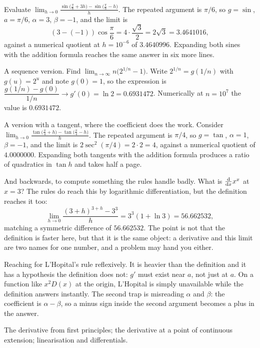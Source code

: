 \begin{worked}
Evaluate $\displaystyle\lim_{h\to0}\frac{\sin\bigl(\tfrac{\pi}{6}+3h\bigr)-\sin\bigl(\tfrac{\pi}{6}-h\bigr)}{h}$. The repeated argument is $\pi/6$, so $g=\sin$, $a=\pi/6$, $\alpha=3$, $\beta=-1$, and the limit is
\[
(3-(-1))\cos\frac{\pi}{6}=4\cdot\frac{\sqrt3}{2}=2\sqrt3=3.4641016 ,
\]
against a numerical quotient at $h=10^{-6}$ of $3.4640996$. Expanding both sines with the addition formula reaches the same answer in six more lines.

A sequence version. Find $\displaystyle\lim_{n\to\infty}n\bigl(2^{1/n}-1\bigr)$. Write $2^{1/n}=g(1/n)$ with $g(u)=2^{u}$ and note $g(0)=1$, so the expression is $\dfrac{g(1/n)-g(0)}{1/n}\to g'(0)=\ln2=0.6931472$. Numerically at $n=10^{7}$ the value is $0.6931472$.

A version with a tangent, where the coefficient does the work. Consider $\displaystyle\lim_{h\to0}\frac{\tan\bigl(\tfrac\pi4+h\bigr)-\tan\bigl(\tfrac\pi4-h\bigr)}{h}$. The repeated argument is $\pi/4$, so $g=\tan$, $\alpha=1$, $\beta=-1$, and the limit is $2\sec^{2}(\pi/4)=2\cdot2=4$, against a numerical quotient of $4.0000000$. Expanding both tangents with the addition formula produces a ratio of quadratics in $\tan h$ and takes half a page.

And backwards, to compute something the rules handle badly. What is $\frac{\mathrm{d}}{\mathrm{d}x}x^{x}$ at $x=3$? The rules do reach this by logarithmic differentiation, but the definition reaches it too:
\[
\lim_{h\to0}\frac{(3+h)^{3+h}-3^{3}}{h}=3^{3}(1+\ln3)=56.662532 ,
\]
matching a symmetric difference of $56.662532$. The point is not that the definition is faster here, but that it is the same object: a derivative and this limit are two names for one number, and a problem may hand you either.
\end{worked}

\begin{trap}
Reaching for L'Hopital's rule reflexively. It is heavier than the definition and it has a hypothesis the definition does not: $g'$ must exist near $a$, not just at $a$. On a function like $x^{2}D(x)$ at the origin, L'Hopital is simply unavailable while the definition answers instantly. The second trap is misreading $\alpha$ and $\beta$: the coefficient is $\alpha-\beta$, so a minus sign inside the second argument becomes a plus in the answer.
\end{trap}

\begin{seealsob}The derivative from first principles; the derivative at a point of continuous extension; linearisation and differentials.\end{seealsob}

